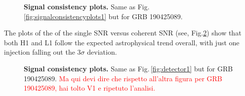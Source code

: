 \documentclass[binding=0.6cm, LaM]{sapthesis}
\newcommand{\fpg}[1]{\textcolor{red}{#1} }
\begin{document}
\begin{figure}[!t]
                        \centering
                        \caption{\textbf{Signal consistency plots.} Same as Fig.\,\ref{fig:signalconsistencyplots1} but for GRB 190425089.}
                        \label{fig:signalconsistencyplots3_final}
                \end{figure}
	The plots of the of the single SNR versus coherent SNR (see, Fig.\ref{fig:detector3_final}) show that both H1 and L1
	follow the expected astrophysical trend overall, with just one  injection falling out the  3$\sigma$ deviation.
	                \begin{figure}[!t]
                        \noindent
                        \label{detector3_final}
                        \centering
                        \caption{\textbf{Signal consistency plots.} Same as Fig.\,\ref{fig:detector1} but for GRB 190425089.   \fpg{Ma qui devi dire che rispetto all'altra figura per GRB 190425089, hai tolto V1 e ripetuto l'analisi.}}
                        \label{fig:detector3_final}
                \end{figure}
	
\end{document}
